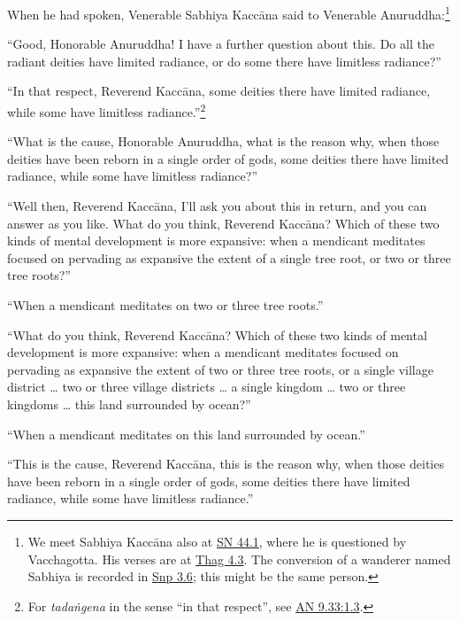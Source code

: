 \documentclass[12pt,openany]{book}%
\begin{document}
When he had spoken, Venerable Sabhiya \textsanskrit{Kaccāna} said to Venerable Anuruddha:\footnote{We meet Sabhiya \textsanskrit{Kaccāna} also at \href{https://suttacentral.net/sn44.1/en/sujato}{SN 44.1}, where he is questioned by Vacchagotta. His verses are at \href{https://suttacentral.net/thag4.3/en/sujato}{Thag 4.3}. The conversion of a wanderer named Sabhiya is recorded in \href{https://suttacentral.net/snp3.6/en/sujato}{Snp 3.6}; this might be the same person. } 

“Good, Honorable Anuruddha! I have a further question about this. Do all the radiant deities have limited radiance, or do some there have limitless radiance?” 

“In that respect, Reverend \textsanskrit{Kaccāna}, some deities there have limited radiance, while some have limitless radiance.”\footnote{For \textit{\textsanskrit{tadaṅgena}} in the sense “in that respect”, see \href{https://suttacentral.net/an9.33/en/sujato\#1.3}{AN 9.33:1.3}. } 

“What is the cause, Honorable Anuruddha, what is the reason why, when those deities have been reborn in a single order of gods, some deities there have limited radiance, while some have limitless radiance?” 

“Well then, Reverend \textsanskrit{Kaccāna}, I’ll ask you about this in return, and you can answer as you like. What do you think, Reverend \textsanskrit{Kaccāna}? Which of these two kinds of mental development is more expansive: when a mendicant meditates focused on pervading as expansive the extent of a single tree root, or two or three tree roots?” 

“When a mendicant meditates on two or three tree roots.” 

“What do you think, Reverend \textsanskrit{Kaccāna}? Which of these two kinds of mental development is more expansive: when a mendicant meditates focused on pervading as expansive the extent of two or three tree roots, or a single village district … two or three village districts … a single kingdom … two or three kingdoms … this land surrounded by ocean?” 

“When a mendicant meditates on this land surrounded by ocean.” 

“This is the cause, Reverend \textsanskrit{Kaccāna}, this is the reason why, when those deities have been reborn in a single order of gods, some deities there have limited radiance, while some have limitless radiance.” 
\end{document}
